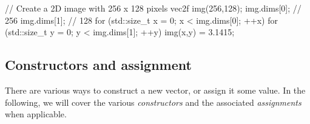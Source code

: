 \documentclass[12pt]{report}
\newenvironment{example}
{
    \begin{mdframed}[style=example,frametitle={Example}]
}
{
    \end{mdframed}
}
\begin{document}
\begin{itemize}
\begin{example}
\begin{cppcode}
// Create a 2D image with 256 x 128 pixels
vec2f img(256,128);
img.dims[0]; // 256
img.dims[1]; // 128
for (std::size_t x = 0; x < img.dims[0]; ++x)
for (std::size_t y = 0; y < img.dims[1]; ++y) {
    img(x,y) = 3.1415;
}
\end{cppcode}
\end{example}
\end{itemize}

\subsection{Constructors and assignment \label{SEC:core:vec:constructor}}

There are various ways to construct a new vector, or assign it some value. In the following, we will cover the various \emph{constructors} and the associated \emph{assignments} when applicable.
\end{document}
